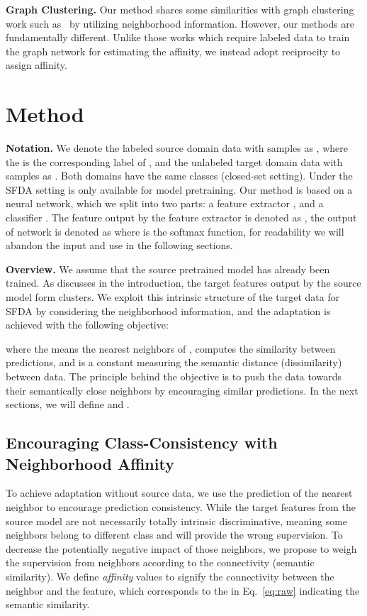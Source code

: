 \documentclass{article}
\begin{document}
\noindent \textbf{Graph Clustering.} Our method shares some similarities with graph clustering work such as~\cite{sarfraz2019efficient,wang2019linkage,yang2020learning,yang2019learning} by utilizing neighborhood information. However, our methods are fundamentally different. Unlike those works which require labeled data to train the graph network for estimating the affinity, we instead adopt reciprocity to assign affinity. 

\section{Method}


\noindent \textbf{Notation.}
We denote the labeled source domain data with  samples as , where the  is the corresponding label of , and the unlabeled target domain data with  samples as . Both domains have the same  classes (closed-set setting). Under the SFDA setting  is only available for model pretraining. Our method is based on a neural network, which we split into two parts: a feature extractor , and a classifier . The feature output by the feature extractor is denoted as , the output of network is denoted as  where  is the softmax function, for readability we will abandon the input and use  in the following sections. 

\noindent \textbf{Overview.} We assume that the source pretrained model has already been trained. As discusses in the introduction, the target features output by the source model form clusters. We exploit this intrinsic structure of the target data for SFDA by considering the neighborhood information, and the adaptation is achieved with the following objective:

where the  means the nearest neighbors of ,  computes the similarity between predictions, and  is a constant measuring the semantic distance (dissimilarity) between data. The principle behind the objective is to push the data towards their semantically close neighbors by encouraging similar predictions. In the next sections, we will define  and .

\subsection{Encouraging Class-Consistency with Neighborhood Affinity} To achieve adaptation without source data, we use the prediction of the nearest neighbor to encourage prediction consistency. 
{While the target features from the source model are not necessarily totally intrinsic discriminative, meaning some neighbors belong to different class and will provide the wrong supervision. To decrease the potentially negative impact of those neighbors, we propose to weigh the supervision from neighbors according to the connectivity (semantic similarity)}.
We define \textit{affinity} values to signify the connectivity between the neighbor and the feature, which corresponds to the  in Eq.~\ref{eq:raw} indicating the semantic similarity. 
\end{document}
